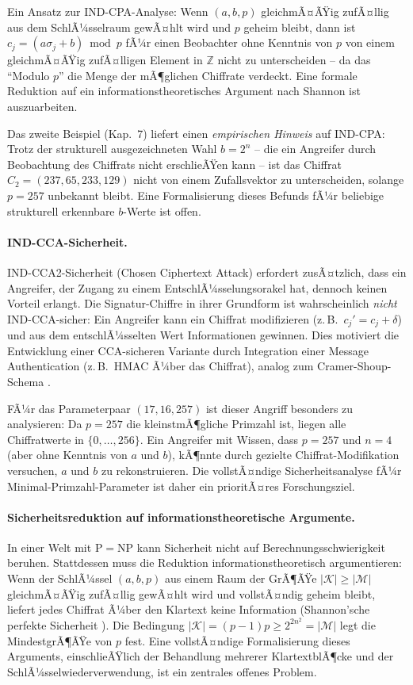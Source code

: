 ﻿\documentclass[a4paper,12pt]{scrreprt}
\theoremstyle{definition}
\begin{document}
Ein Ansatz zur IND-CPA-Analyse: Wenn $(a, b, p)$ gleichmÃ¤ÃŸig zufÃ¤llig aus dem SchlÃ¼sselraum gewÃ¤hlt wird und $p$ geheim bleibt, dann ist $c_j = (a\sigma_j + b) \bmod p$ fÃ¼r einen Beobachter ohne Kenntnis von $p$ von einem gleichmÃ¤ÃŸig zufÃ¤lligen Element in $\mathbb{Z}$ nicht zu unterscheiden -- da das ``Modulo $p$'' die Menge der mÃ¶glichen Chiffrate verdeckt. Eine formale Reduktion auf ein informationstheoretisches Argument nach Shannon \cite{Sha49} ist auszuarbeiten.

Das zweite Beispiel (Kap.~7) liefert einen \emph{empirischen Hinweis} auf IND-CPA: Trotz der strukturell ausgezeichneten Wahl $b = 2^n$ -- die ein Angreifer durch Beobachtung des Chiffrats nicht erschlieÃŸen kann -- ist das Chiffrat $C_2 = (237, 65, 233, 129)$ nicht von einem Zufallsvektor zu unterscheiden, solange $p = 257$ unbekannt bleibt. Eine Formalisierung dieses Befunds fÃ¼r beliebige strukturell erkennbare $b$-Werte ist offen.

\paragraph{IND-CCA-Sicherheit.}
IND-CCA2-Sicherheit (Chosen Ciphertext Attack) \cite{RS91} erfordert zusÃ¤tzlich, dass ein Angreifer, der Zugang zu einem EntschlÃ¼sselungsorakel hat, dennoch keinen Vorteil erlangt. Die Signatur-Chiffre in ihrer Grundform ist wahrscheinlich \emph{nicht} IND-CCA-sicher: Ein Angreifer kann ein Chiffrat modifizieren (z.\,B.\ $c_j' = c_j + \delta$) und aus dem entschlÃ¼sselten Wert Informationen gewinnen. Dies motiviert die Entwicklung einer CCA-sicheren Variante durch Integration einer Message Authentication (z.\,B.\ HMAC Ã¼ber das Chiffrat), analog zum Cramer-Shoup-Schema \cite{ElG85}.

FÃ¼r das Parameterpaar $(17, 16, 257)$ ist dieser Angriff besonders zu analysieren: Da $p = 257$ die kleinstmÃ¶gliche Primzahl ist, liegen alle Chiffratwerte in $\{0, \ldots, 256\}$. Ein Angreifer mit Wissen, dass $p = 257$ und $n = 4$ (aber ohne Kenntnis von $a$ und $b$), kÃ¶nnte durch gezielte Chiffrat-Modifikation versuchen, $a$ und $b$ zu rekonstruieren. Die vollstÃ¤ndige Sicherheitsanalyse fÃ¼r Minimal-Primzahl-Parameter ist daher ein prioritÃ¤res Forschungsziel.

\paragraph{Sicherheitsreduktion auf informationstheoretische Argumente.}
In einer Welt mit $\mathrm{P}=\mathrm{NP}$ \cite{Epp26a} kann Sicherheit nicht auf Berechnungsschwierigkeit beruhen. Stattdessen muss die Reduktion informationstheoretisch argumentieren: Wenn der SchlÃ¼ssel $(a,b,p)$ aus einem Raum der GrÃ¶ÃŸe $|\mathcal{K}| \geq |\mathcal{M}|$ gleichmÃ¤ÃŸig zufÃ¤llig gewÃ¤hlt wird und vollstÃ¤ndig geheim bleibt, liefert jedes Chiffrat Ã¼ber den Klartext keine Information (Shannon'sche perfekte Sicherheit \cite{Sha49}). Die Bedingung $|\mathcal{K}| = (p-1)p \geq 2^{2n^2} = |\mathcal{M}|$ legt die MindestgrÃ¶ÃŸe von $p$ fest. Eine vollstÃ¤ndige Formalisierung dieses Arguments, einschlieÃŸlich der Behandlung mehrerer KlartextblÃ¶cke und der SchlÃ¼sselwiederverwendung, ist ein zentrales offenes Problem.
\end{document}
